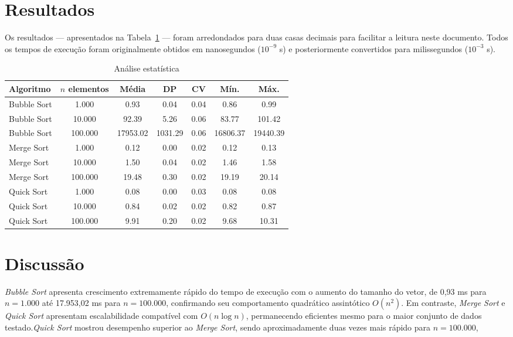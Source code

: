 \documentclass[12pt]{article}
\begin{document}
\section{Resultados}

Os resultados --- apresentados na Tabela~\ref{tab:estatisticas_ms} --- foram arredondados para duas casas decimais para facilitar a leitura neste documento. Todos os tempos de execução foram originalmente obtidos em nanosegundos ($10^{-9}$ s) e posteriormente convertidos para milissegundos ($10^{-3}$ s).

\begin{table}[h!]
\centering
\caption{Análise estatística}
\label{tab:estatisticas_ms}
\begin{tabular}{|l|c|c|c|c|c|c|}
\hline
\textbf{Algoritmo} & \textbf{$n$ elementos} & \textbf{Média} & \textbf{DP} & \textbf{CV} & \textbf{Mín.} & \textbf{Máx.} \\ \hline
Bubble Sort & 1.000 & 0.93 & 0.04 & 0.04 & 0.86 & 0.99 \\ 
Bubble Sort & 10.000 & 92.39 & 5.26 & 0.06 & 83.77 & 101.42 \\ 
Bubble Sort & 100.000 & 17953.02 & 1031.29 & 0.06 & 16806.37 & 19440.39 \\ \hline
Merge Sort & 1.000 & 0.12 & 0.00 & 0.02 & 0.12 & 0.13 \\ 
Merge Sort & 10.000 & 1.50 & 0.04 & 0.02 & 1.46 & 1.58 \\ 
Merge Sort & 100.000 & 19.48 & 0.30 & 0.02 & 19.19 & 20.14 \\ \hline
Quick Sort & 1.000 & 0.08 & 0.00 & 0.03 & 0.08 & 0.08 \\ 
Quick Sort & 10.000 & 0.84 & 0.02 & 0.02 & 0.82 & 0.87 \\ 
Quick Sort & 100.000 & 9.91 & 0.20 & 0.02 & 9.68 & 10.31 \\ \hline
\end{tabular}
\end{table}

\section{Discussão}

\textit{Bubble Sort} apresenta crescimento extremamente rápido do tempo de execução com o aumento do tamanho do vetor, de 0,93 ms para $n=1.000$ até 17.953,02 ms para $n=100.000$, confirmando seu comportamento quadrático assintótico $O(n^2)$. Em contraste, \textit{Merge Sort} e \textit{Quick Sort} apresentam escalabilidade compatível com $O(n \log n)$, permanecendo eficientes mesmo para o maior conjunto de dados testado.\textit{Quick Sort} mostrou desempenho superior ao \textit{Merge Sort}, sendo aproximadamente duas vezes mais rápido para $n=100.000$,
\end{document}
